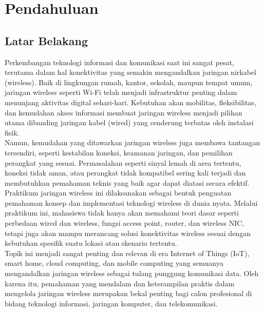 \section{Pendahuluan}
\subsection{Latar Belakang}
Perkembangan teknologi informasi dan komunikasi saat ini sangat pesat, terutama dalam hal konektivitas yang semakin mengandalkan jaringan nirkabel (wireless). Baik di lingkungan rumah, kantor, sekolah, maupun tempat umum, jaringan wireless seperti Wi-Fi telah menjadi infrastruktur penting dalam menunjang aktivitas digital sehari-hari. Kebutuhan akan mobilitas, fleksibilitas, dan kemudahan akses informasi membuat jaringan wireless menjadi pilihan utama dibanding jaringan kabel (wired) yang cenderung terbatas oleh instalasi fisik. \\ Namun, kemudahan yang ditawarkan jaringan wireless juga membawa tantangan tersendiri, seperti kestabilan koneksi, keamanan jaringan, dan pemilihan perangkat yang sesuai. Permasalahan seperti sinyal lemah di area tertentu, koneksi tidak aman, atau perangkat tidak kompatibel sering kali terjadi dan membutuhkan pemahaman teknis yang baik agar dapat diatasi secara efektif. \\ Praktikum jaringan wireless ini dilaksanakan sebagai bentuk penguatan pemahaman konsep dan implementasi teknologi wireless di dunia nyata. Melalui praktikum ini, mahasiswa tidak hanya akan memahami teori dasar seperti perbedaan wired dan wireless, fungsi access point, router, dan wireless NIC, tetapi juga akan mampu merancang solusi konektivitas wireless sesuai dengan kebutuhan spesifik suatu lokasi atau skenario tertentu. \\ Topik ini menjadi sangat penting dan relevan di era Internet of Things (IoT), smart home, cloud computing, dan mobile computing yang semuanya mengandalkan jaringan wireless sebagai tulang punggung komunikasi data. Oleh karena itu, pemahaman yang mendalam dan keterampilan praktis dalam mengelola jaringan wireless merupakan bekal penting bagi calon profesional di bidang teknologi informasi, jaringan komputer, dan telekomunikasi.

